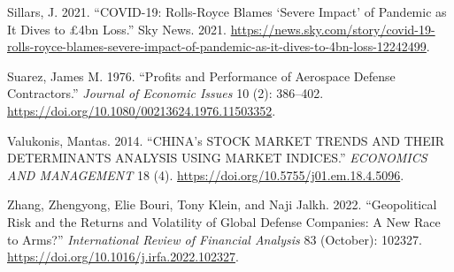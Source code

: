 \documentclass[
  letterpaper,
  DIV=11,
  numbers=noendperiod]{scrartcl}
\newlength{\cslhangindent}
\newlength{\cslentryspacingunit} %
\newenvironment{CSLReferences}[2] %
 {%
  \setlength{\parindent}{0pt}
  \ifodd #1
  \let\oldpar\par
  \def\par{\hangindent=\cslhangindent\oldpar}
  \fi
  \setlength{\parskip}{#2\cslentryspacingunit}
 }%
 {}
\begin{document}
\begin{CSLReferences}{1}{0}
\leavevmode{}%
Sillars, J. 2021. {``COVID-19: Rolls-Royce Blames {`Severe Impact'} of
Pandemic as It Dives to £4bn Loss.''} Sky News. 2021.
\url{https://news.sky.com/story/covid-19-rolls-royce-blames-severe-impact-of-pandemic-as-it-dives-to-4bn-loss-12242499}.

\leavevmode{}%
Suarez, James M. 1976. {``Profits and Performance of Aerospace Defense
Contractors.''} \emph{Journal of Economic Issues} 10 (2): 386--402.
\url{https://doi.org/10.1080/00213624.1976.11503352}.

\leavevmode{}%
Valukonis, Mantas. 2014. {``CHINA's STOCK MARKET TRENDS AND THEIR
DETERMINANTS ANALYSIS USING MARKET INDICES.''} \emph{ECONOMICS AND
MANAGEMENT} 18 (4). \url{https://doi.org/10.5755/j01.em.18.4.5096}.

\leavevmode{}%
Zhang, Zhengyong, Elie Bouri, Tony Klein, and Naji Jalkh. 2022.
{``Geopolitical Risk and the Returns and Volatility of Global Defense
Companies: A New Race to Arms?''} \emph{International Review of
Financial Analysis} 83 (October): 102327.
\url{https://doi.org/10.1016/j.irfa.2022.102327}.

\end{CSLReferences}
\end{document}
